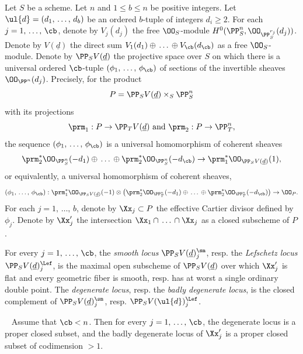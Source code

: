 \begin{nota}\label{notat-CI-b}
Let $S$ be a scheme. Let $n$ and $1\leq b \leq n$ be positive integers. Let $\ul{d}=(d_1,\,\dots,\,d_b)$ be an ordered $b$-tuple of integers $d_i\geq 2$. For each $j=1,\,\dots,\,\cb$, denote by $V_j(d_j)$ the free $\OO_S$-module $H^0(\PP^{n}_S,\OO_{\PP^{r_j}_S}(d_j))$. Denote by $V(\underline{d})$ the direct sum $V_1(d_1)\oplus\,\dots\,\oplus V_\cb(d_\cb)$ as a free $\OO_S$-module. Denote by $\PP_S V(\underline{d})$ the projective space over $S$ on which there is a universal ordered $\cb$-tuple $(\phi_1,\,\dots,\,\phi_\cb)$ of sections of the invertible sheaves $\OO_{\PP^{n}}(d_j)$. Precisely, for the product
\[
P=\PP_S V(\underline{d}) \times_S \PP^n_S
\]
with its projections
\[
\prm_1:P\to
\PP_TV(\underline{d}) \text{ and }
\prm_2:P\to \PP_T^{n},
\]
the sequence $(\phi_1,\,\dots,\,\phi_\cb)$ is a universal homomorphism of coherent sheaves
\[
\prm_2^*\OO_{\PP^{n}_S}(-d_1)\oplus\,\dots\, \oplus
\prm_2^*\OO_{\PP^{n}_S}(-d_\cb) \to \prm_1^*\OO_{\PP_S V(\underline{d})}(1),
\]
or equivalently, a universal homomorphism of coherent sheaves,
\[
(\phi_1,\,\dots,\,\phi_\cb):\prm_1^*\OO_{\PP_S V(\underline{d})}(-1)\otimes\left(\prm_2^*\OO_{\PP^{n}_T}(-d_1)\oplus
\,\dots\,\oplus
\prm_2^*\OO_{\PP^{n}_T}(-d_\cb)\right) \to \OO_P.
\]
For each $j=1,\,\dots,\,b$, denote by $\Xx_j\subset P$ the effective Cartier divisor defined by $\phi_j$. Denote by $\Xx'_j$ the intersection $\Xx_1\cap\,\dots\,\cap \Xx_j$ as a closed subscheme of $P$.
\end{nota}

\begin{defi} \label{defn-CI2-b}
For every $j=1,\,\dots,\,\cb$, the \emph{smooth locus} $\PP_S V(\underline{d})^{\sm}_j$, resp. the
\emph{Lefschetz locus} $\PP_S V(\underline{d})^{\Lef}_j$, is the maximal open subscheme of $\PP_S V(\underline{d})$ over which $\Xx'_j$ is flat and every geometric fiber is smooth, resp. has at worst a single ordinary double point. The \emph{degenerate locus}, resp. the
\emph{badly degenerate locus}, is the closed complement of $\PP_S V(\underline{d})_j^{\sm}$, resp. $\PP_S V(\ul{d})_j^{\Lef}$.
\end{defi}

\begin{prop}
~\cite[Exposé XVII, Théorème
2.5]{SGA7II} \label{prop-Lef-b}
Assume that $\cb < n$. Then for every $j=1,\,\dots,\,\cb$, the degenerate locus is a proper closed subset, and the badly degenerate locus of $\Xx'_j$ is a proper closed subset of codimension $>1$.
\end{prop}

